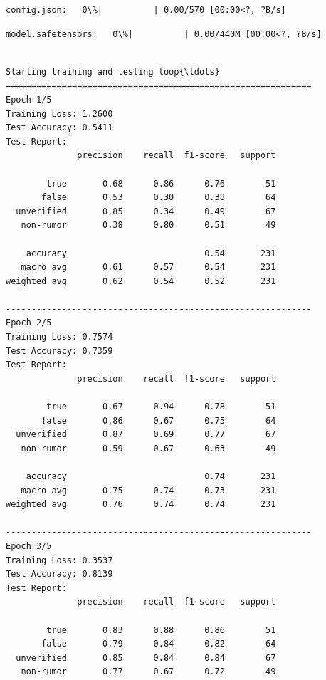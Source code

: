 \documentclass[11pt]{article}
\begin{document}
    
    
    \begin{Verbatim}[commandchars=\\\{\}]
config.json:   0\%|          | 0.00/570 [00:00<?, ?B/s]
    \end{Verbatim}

    
    
    \begin{Verbatim}[commandchars=\\\{\}]
model.safetensors:   0\%|          | 0.00/440M [00:00<?, ?B/s]
    \end{Verbatim}

    
    \begin{Verbatim}[commandchars=\\\{\}]

Starting training and testing loop{\ldots}
============================================================
Epoch 1/5
Training Loss: 1.2600
Test Accuracy: 0.5411
Test Report:
              precision    recall  f1-score   support

        true       0.68      0.86      0.76        51
       false       0.53      0.30      0.38        64
  unverified       0.85      0.34      0.49        67
   non-rumor       0.38      0.80      0.51        49

    accuracy                           0.54       231
   macro avg       0.61      0.57      0.54       231
weighted avg       0.62      0.54      0.52       231

------------------------------------------------------------
Epoch 2/5
Training Loss: 0.7574
Test Accuracy: 0.7359
Test Report:
              precision    recall  f1-score   support

        true       0.67      0.94      0.78        51
       false       0.86      0.67      0.75        64
  unverified       0.87      0.69      0.77        67
   non-rumor       0.59      0.67      0.63        49

    accuracy                           0.74       231
   macro avg       0.75      0.74      0.73       231
weighted avg       0.76      0.74      0.74       231

------------------------------------------------------------
Epoch 3/5
Training Loss: 0.3537
Test Accuracy: 0.8139
Test Report:
              precision    recall  f1-score   support

        true       0.83      0.88      0.86        51
       false       0.79      0.84      0.82        64
  unverified       0.85      0.84      0.84        67
   non-rumor       0.77      0.67      0.72        49


\end{Verbatim}
\end{document}
